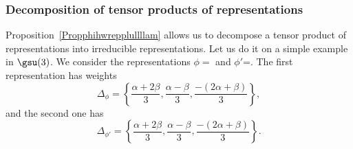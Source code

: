 %

\subsubsection{Decomposition of tensor products of representations}


%

%

%


Proposition~\ref{Propphihwrepplullllam} allows us to decompose a tensor product of representations into irreducible representations. Let us do it on a simple example in $\gsu(3)$. We consider the representations $\phi=$ and $\phi'$=. The first representation has weights
\begin{equation}
	\Delta_{\phi}=\left\{ \frac{ \alpha+2\beta }{ 3 },\frac{ \alpha-\beta }{ 3 },\frac{ -(2\alpha+\beta) }{ 3 } \right\},
\end{equation}
and the second one has
\begin{equation}
	\Delta_{\phi'}=\left\{ \frac{ \alpha+2\beta }{ 3 },\frac{ \alpha-\beta }{ 3 },\frac{ -(2\alpha+\beta) }{ 3 } \right\}.
\end{equation}

